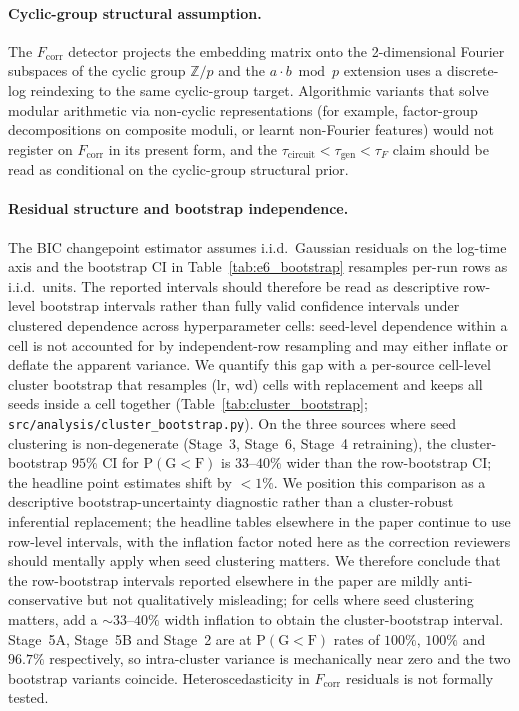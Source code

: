 \documentclass{article}
\newcommand{\taug}{\tau_{\mathrm{gen}}}
\newcommand{\tauf}{\tau_{F}}
\newcommand{\taucirc}{\tau_{\mathrm{circuit}}}
\newcommand{\fcorr}{F_{\mathrm{corr}}}
\begin{document}
\paragraph{Cyclic-group structural assumption.}
The $\fcorr$ detector projects the embedding matrix onto the
2-dimensional Fourier subspaces of the cyclic group $\mathbb{Z}/p$
and the $a\cdot b\bmod p$ extension uses a discrete-log reindexing
to the same cyclic-group target.
Algorithmic variants that solve modular arithmetic via non-cyclic
representations (for example, factor-group decompositions on
composite moduli, or learnt non-Fourier features) would not
register on $\fcorr$ in its present form, and the
$\taucirc<\taug<\tauf$ claim should be read as conditional on the
cyclic-group structural prior.

\paragraph{Residual structure and bootstrap independence.}
The BIC changepoint estimator assumes i.i.d.\ Gaussian residuals on
the log-time axis and the bootstrap CI in
Table~\ref{tab:e6_bootstrap} resamples per-run rows as i.i.d.\
units.
The reported intervals should therefore be read as descriptive
row-level bootstrap intervals rather than fully valid confidence
intervals under clustered dependence across hyperparameter cells:
seed-level dependence within a cell is not accounted for by
independent-row resampling and may either inflate or deflate the
apparent variance.
We quantify this gap with a per-source cell-level cluster
bootstrap that resamples (lr, wd) cells with replacement and
keeps all seeds inside a cell together
(Table~\ref{tab:cluster_bootstrap};
\texttt{src/analysis/cluster\_bootstrap.py}).
On the three sources where seed clustering is non-degenerate
(Stage~3, Stage~6, Stage~4 retraining), the cluster-bootstrap
$95\%$ CI for $\mathrm{P}(\mathrm{G}{<}\mathrm{F})$ is $33$--$40\%$
wider than the row-bootstrap CI; the headline point estimates
shift by $<1\%$.
We position this comparison as a descriptive bootstrap-uncertainty
diagnostic rather than a cluster-robust inferential replacement;
the headline tables elsewhere in the paper continue to use
row-level intervals, with the inflation factor noted here as the
correction reviewers should mentally apply when seed clustering
matters.
We therefore conclude that the row-bootstrap intervals reported
elsewhere in the paper are mildly anti-conservative but not
qualitatively misleading; for cells where seed clustering matters,
add a $\sim$$33$--$40\%$ width inflation to obtain the
cluster-bootstrap interval.
Stage~5A, Stage~5B and Stage~2 are at $\mathrm{P}(\mathrm{G}{<}\mathrm{F})$
rates of $100\%$, $100\%$ and $96.7\%$ respectively, so
intra-cluster variance is mechanically near zero and the two
bootstrap variants coincide.
Heteroscedasticity in $\fcorr$ residuals is not formally tested.
\end{document}
